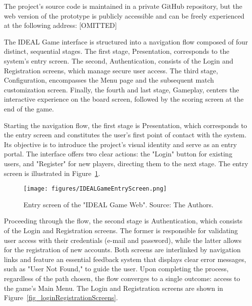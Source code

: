 \documentclass[english]{sbc2025}
\begin{document}
The project's source code is maintained in a private GitHub repository, but the web version of the prototype is publicly accessible and can be freely experienced at the following address: [OMITTED]



The IDEAL Game interface is structured into a navigation flow composed of four distinct, sequential stages. The first stage, Presentation, corresponds to the system's entry screen. The second, Authentication, consists of the Login and Registration screens, which manage secure user access. The third stage, Configuration, encompasses the Menu page and the subsequent match customization screen. Finally, the fourth and last stage, Gameplay, centers the interactive experience on the board screen, followed by the scoring screen at the end of the game.

Starting the navigation flow, the first stage is Presentation, which corresponds to the entry screen and constitutes the user's first point of contact with the system. Its objective is to introduce the project's visual identity and serve as an entry portal. The interface offers two clear actions: the "Login" button for existing users, and "Register" for new players, directing them to the next stage. The entry screen is illustrated in Figure~\ref{fig_idealGameEntryScreen}.

\begin{figure}[h]
  \centering
  \texttt{[image: figures/IDEALGameEntryScreen.png]}
  \caption{Entry screen of the "IDEAL Game Web". Source: The Authors.}
  \label{fig_idealGameEntryScreen}
\end{figure}

Proceeding through the flow, the second stage is Authentication, which consists of the Login and Registration screens. The former is responsible for validating user access with their credentials (e-mail and password), while the latter allows for the registration of new accounts. Both screens are interlinked by navigation links and feature an essential feedback system that displays clear error messages, such as "User Not Found," to guide the user. Upon completing the process, regardless of the path chosen, the flow converges to a single outcome: access to the game's Main Menu. The Login and Registration screens are shown in Figure~\ref{fig_loginRegistrationScreens}.
\end{document}
